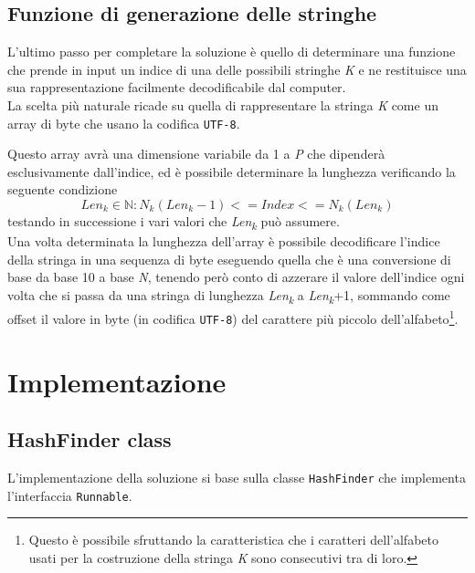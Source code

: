 \documentclass{article}
\begin{document}
   \subsection{Funzione di generazione delle stringhe}
   L'ultimo passo per completare la soluzione è quello di determinare una funzione che prende in input un indice di una delle possibili stringhe \textit{K} e ne restituisce una sua rappresentazione facilmente decodificabile dal computer.\\
   La scelta più naturale ricade su quella di rappresentare la stringa \textit{K} come un array di byte che usano la codifica \verb|UTF-8|.
   \newpage    %

   Questo array avrà una dimensione variabile da 1 a \textit{P} che dipenderà esclusivamente dall'indice, ed è possibile determinare la lunghezza verificando la seguente condizione
   \[ Len_{k} \in \mathbb{N}: N_{k}(Len_{k}-1) <= Index <= N_{k}(Len_{k}) \]
   testando in successione i vari valori che \textit{Len\textsubscript{k}} può assumere.\\

   Una volta determinata la lunghezza dell'array è possibile decodificare l'indice della stringa in una sequenza di byte eseguendo quella che è una conversione di base da base 10 a base \textit{N}, tenendo però conto di azzerare il valore dell'indice ogni volta che si passa da una stringa di lunghezza \textit{Len\textsubscript{k}} a \textit{Len\textsubscript{k}}+1, sommando come offset il valore in byte (in codifica \verb|UTF-8|) del carattere più piccolo dell'alfabeto\footnote{Questo è possibile sfruttando la caratteristica che i caratteri dell'alfabeto usati per la costruzione della stringa \textit{K} sono consecutivi tra di loro.}.
   \newpage    %

   \section{Implementazione}
   \subsection{HashFinder class}
   L'implementazione della soluzione si base sulla classe \verb|HashFinder| che implementa l'interfaccia \verb|Runnable|.\\
\end{document}
